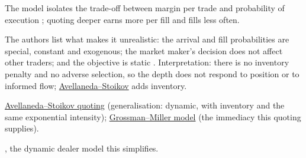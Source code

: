 \begin{qfmodel}
 The model isolates the trade-off between margin per trade and probability of execution \citep[same chap., p.~30]{crypto-cartea}; quoting deeper earns more per fill and fills less often.

 The authors list what makes it unrealistic: the arrival and fill probabilities are special, constant and exogenous; the market maker's decision does not affect other traders; and the objective is static \citep[same chap., p.~30]{crypto-cartea}. Interpretation: there is no inventory penalty and no adverse selection, so the depth does not respond to position or to informed flow; \hyperref[mod:avellaneda-stoikov]{Avellaneda--Stoikov} adds inventory.

 \hyperref[mod:avellaneda-stoikov]{Avellaneda--Stoikov quoting} (generalisation: dynamic, with inventory and the same exponential intensity); \hyperref[mod:grossman-miller]{Grossman--Miller model} (the immediacy this quoting supplies).

 \citep{ho-stoll-1981}, the dynamic dealer model this simplifies.

\end{qfmodel}

